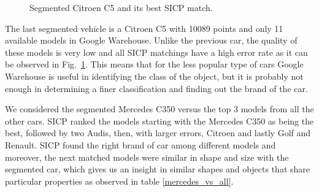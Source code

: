 \documentclass{llncs}
\begin{document}
  \begin{figure}[Ht]
    \centering
    \hspace{3 mm}
    \hspace{3 mm}
    \caption{Segmented Citroen C5 and its best SICP match.}
    \label{citroen_trio}
  \end{figure}

The last segmented vehicle is a Citroen C5 with 10089 points and only
11 available models in Google Warehouse. Unlike the previous car, the
quality of these models is very low and all SICP matchings have a high
error rate as it can be observed in Fig.~\ref{citroen_trio}. This
means that for the less popular type of cars Google Warehouse is
useful in identifying the class of the object, but it is probably not
enough in determining a finer classification and finding out the brand
of the car.

We considered the segmented Mercedes C350 versus the top 3 models from
all the other cars. SICP ranked the models starting with the Mercedes
C350 as being the best, followed by two Audis, then, with larger
errors, Citroen and lastly Golf and Renault. SICP found the right
brand of car among different models and moreover, the next matched
models were similar in shape and size with the segmented car, which
gives us an insight in similar shapes and objects that share
particular properties as observed in table \ref{mercedes_vs_all}.
\end{document}
